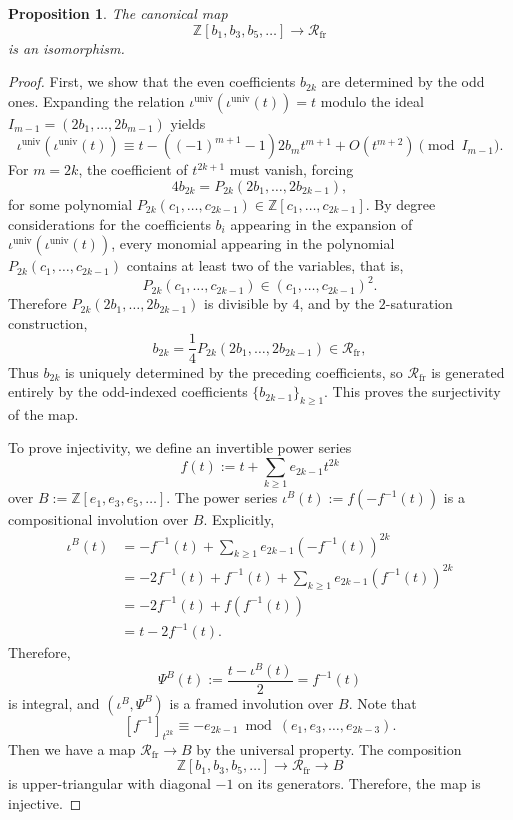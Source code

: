 \documentclass[a4paper]{amsart}
\theoremstyle{plain}
\newtheorem{proposition}[subsubsection]{Proposition}
\theoremstyle{definition}
\newcommand{\ZZ}{\mathbb{Z}}
\newcommand{\univ}{\mathrm{univ}}
\newcommand{\Rfr}{\mathcal{R}_{\mathrm{fr}}}
\renewcommand{\ge}{\geqslant}
\begin{document}
\begin{proposition}
	The canonical map
	\[
		\ZZ[b_1,b_3,b_5,\ldots]\longrightarrow \Rfr
	\]
	is an isomorphism.
\end{proposition}
\begin{proof}

	First, we show that the even coefficients $b_{2k}$ are determined by the odd ones. Expanding the relation $\iota^{\univ}(\iota^{\univ}(t))=t$ modulo the ideal $I_{m-1} = (2b_1, \dots, 2b_{m-1})$ yields
	\[
		\iota^{\univ}(\iota^{\univ}(t)) \equiv t - ((-1)^{m+1}-1) 2 b_m t^{m+1} + O(t^{m+2}) \pmod{I_{m-1}}.
	\]
	For $m=2k$, the coefficient of $t^{2k+1}$ must vanish, forcing
	\[
		4b_{2k} = P_{2k}(2b_1, \dots, 2b_{2k-1}),
	\]
	for some polynomial $P_{2k}(c_1,\ldots,c_{2k-1}) \in \ZZ[c_1,\ldots,c_{2k-1}]$. By degree considerations for the coefficients $b_i$ appearing in the expansion of $\iota^{\univ}(\iota^{\univ}(t))$, every monomial appearing in the polynomial $P_{2k}(c_1,\ldots,c_{2k-1})$ contains at least two of the variables, that is,
	\[
		P_{2k}(c_1,\ldots,c_{2k-1}) \in (c_1,\ldots,c_{2k-1})^2.
	\]
	Therefore $P_{2k}(2b_1, \dots, 2b_{2k-1})$ is divisible by $4$, and by the $2$-saturation construction,
	\[
		b_{2k} = \frac{1}{4} P_{2k}(2b_1, \dots, 2b_{2k-1}) \in \Rfr,
	\]
	Thus $b_{2k}$ is uniquely determined by the preceding coefficients, so $\Rfr$ is generated entirely by the odd-indexed coefficients $\{b_{2k-1}\}_{k\ge 1}$. This proves the surjectivity of the map.

	To prove injectivity, we define an invertible power series
	\[
		f(t) := t + \sum_{k\ge 1} e_{2k-1} t^{2k}
	\]
	over $B:=\ZZ[e_1,e_3,e_5,\ldots]$. The power series $\iota^{B}(t):= f(-f^{-1}(t))$ is a compositional involution over $B$. Explicitly,
	\[
		\begin{aligned}
			\iota^{B}(t) & = -f^{-1}(t) + \sum_{k\ge 1} e_{2k-1} \left(- f^{-1}(t)\right)^{2k}            \\
			             & = -2f^{-1}(t) + f^{-1}(t) + \sum_{k\ge 1} e_{2k-1} \left(f^{-1}(t)\right)^{2k} \\
			             & = -2f^{-1}(t) + f\left(f^{-1}(t)\right)                                        \\
			             & = t - 2 f^{-1}(t).
		\end{aligned}
	\]
	Therefore,
	\[
		\Psi^{B}(t) := \frac{t - \iota^{B}(t) }{2} = f^{-1}(t)
	\]
	is integral, and $(\iota^{B}, \Psi^{B})$ is a framed involution over $B$. Note that
	\[
		[f^{-1}]_{t^{2k}} \equiv - e_{2k-1} \bmod (e_{1}, e_3, \ldots, e_{2k-3}).
	\]
	Then we have a map $\Rfr \to B$ by the universal property. The composition
	\[
		\ZZ[b_1,b_3,b_5,\ldots] \to \Rfr \to B
	\]
	is upper-triangular with diagonal $-1$ on its generators. Therefore, the map is injective.
\end{proof}
\end{document}
